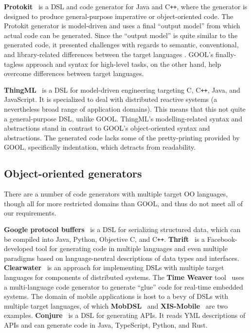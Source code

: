 \documentclass[sigplan,review,anonymous,prologue,dvipsnames]{acmart}
\newcommand{\Cplusplus}{C\texttt{++}}
\begin{document}
\textbf{Protokit}~\cite{kovesdan2017multi} is a DSL and code generator for Java and
\Cplusplus, where the generator is designed to produce
general-purpose imperative or object-oriented code. The Protokit generator is
model-driven and uses a final ``output model'' from which actual code can be
generated. Since the ``output model'' is quite similar to the generated
code, it presented challenges with regards to semantic, conventional, and
library-related differences between the target languages
\cite{kovesdan2017multi}. GOOL's finally-tagless approach and syntax for
high-level tasks, on the other hand, help overcome differences between
target languages.

\textbf{ThingML}~\cite{harrand2016thingml} is a DSL for model-driven engineering
targeting C, \Cplusplus, Java, and JavaScript. It is specialized to deal with
distributed reactive systems (a nevertheless broad range of application domains).
This means that this not quite a general-purpose DSL, unlike GOOL.
ThingML's modelling-related syntax and abstractions stand in contrast to GOOL's
object-oriented syntax and abstractions. The generated code lacks some of the
pretty-printing provided by GOOL, specifically indentation, which detracts from
readability.

\subsection{Object-oriented generators}

There are a number of code generators with multiple target OO languages,
though all for more restricted domains than GOOL, and thus do not meet all
of our requirements.

\textbf{Google protocol buffers}~\cite{Protobuf} is a DSL for serializing
structured data, which can be compiled into Java, Python, Objective C, and
\Cplusplus.  \textbf{Thrift}~\cite{slee2007thrift} is a Facebook-developed tool
for generating code in multiple languages and even multiple paradigms based on
language-neutral descriptions of data types and interfaces.
\textbf{Clearwater}~\cite{swint2005clearwater} is an approach for implementing
DSLs with multiple target languages for components of distributed systems.  The
\textbf{Time Weaver} tool~\cite{de2004glue} uses a multi-language code
generator to generate ``glue'' code for real-time embedded systems.  The domain
of mobile applications is host to a bevy of DSLs with multiple target
languages, of which \textbf{MobDSL}~\cite{kramer2010mobdsl} and
\textbf{XIS-Mobile}~\cite{ribeiro2014xis} are two examples.
\textbf{Conjure}~\cite{Conjure} is a DSL for generating APIs. It reads YML
descriptions of APIs and can generate code in Java, TypeScript, Python, and
Rust.
\end{document}
